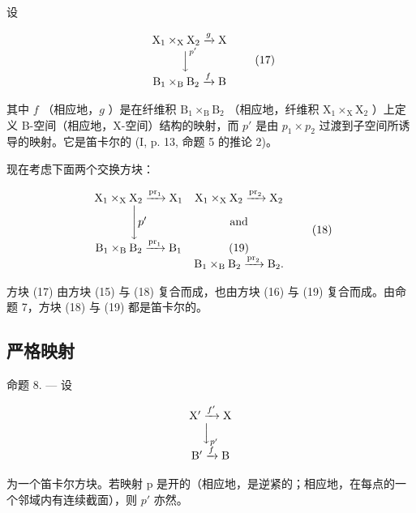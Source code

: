   设

\[
\begin{array}{c} \mathrm{X} _ {1} \times_ {\mathrm{X}} \mathrm{X} _ {2} \xrightarrow {g} \mathrm{X} \\ \Big \downarrow^ {p ^ {\prime}} \\ \mathrm{B} _ {1} \times_ {\mathrm{B}} \mathrm{B} _ {2} \xrightarrow {f} \mathrm{B} \end{array}\tag{17}
\]

其中 \(f\) （相应地，\(g\) ）是在纤维积 \(\mathrm{B}_{1} \times_{\mathrm{B}} \mathrm{B}_{2}\) （相应地，纤维积 \(\mathrm{X}_{1} \times_{\mathrm{X}} \mathrm{X}_{2}\) ）上定义 B-空间（相应地，X-空间）结构的映射，而 \(p'\) 是由 \(p_{1} \times p_{2}\) 过渡到子空间所诱导的映射。它是笛卡尔的 (I, p. 13, 命题 5 的推论 2)。

现在考虑下面两个交换方块：

\[
\begin{array}{c c} \mathrm{X} _ {1} \times_ {\mathrm{X}} \mathrm{X} _ {2} \xrightarrow {\operatorname{pr} _ {1}} \mathrm{X} _ {1} & \mathrm{X} _ {1} \times_ {\mathrm{X}} \mathrm{X} _ {2} \xrightarrow {\operatorname{pr} _ {2}} \mathrm{X} _ {2} \\ \Biggl \downarrow p ^ {\prime} & \text {and} \\ \mathrm{B} _ {1} \times_ {\mathrm{B}} \mathrm{B} _ {2} \xrightarrow {\operatorname{pr} _ {1}} \mathrm{B} _ {1} & \mathrm{(19)} \\ & \mathrm{B} _ {1} \times_ {\mathrm{B}} \mathrm{B} _ {2} \xrightarrow {\operatorname{pr} _ {2}} \mathrm{B} _ {2}. \end{array}\tag{18}
\]

方块 (17) 由方块 (15) 与 (18) 复合而成，也由方块 (16) 与 (19) 复合而成。由命题 7，方块 (18) 与 (19) 都是笛卡尔的。

\subsection{严格映射}

命题 8. --- 设

\[
\begin{array}{c} \mathrm {X^ {\prime}} \xrightarrow {f ^ {\prime}} \mathrm{X} \\ \Big \downarrow_ {p ^ {\prime}} \\ \mathrm {B^ {\prime}} \xrightarrow {f} \mathrm{B} \end{array}
\]

为一个笛卡尔方块。若映射 p 是开的（相应地，是逆紧的；相应地，在每点的一个邻域内有连续截面），则 \(p'\) 亦然。

